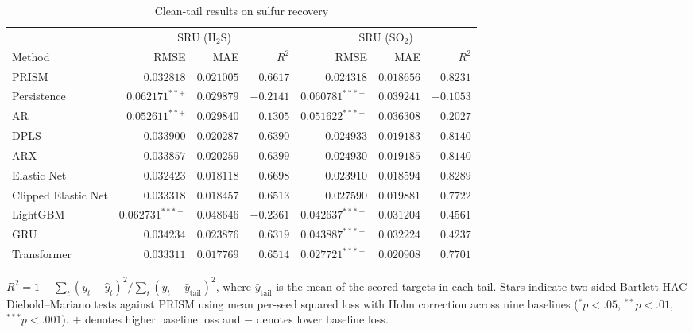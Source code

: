 \begin{table}[!t]
\centering
\caption{Clean-tail results on sulfur recovery}
\label{tab:clean-sru}
\small
\begin{tabular}{lrrrrrr}
\hline
 & \multicolumn{3}{c}{SRU ($\mathrm{H_2S}$)} & \multicolumn{3}{c}{SRU ($\mathrm{SO_2}$)} \\
\cline{2-4}\cline{5-7}
Method & RMSE & MAE & $R^2$ & RMSE & MAE & $R^2$ \\
\hline
PRISM & \(0.032818\) & \(0.021005\) & \(0.6617\) & \(0.024318\) & \(0.018656\) & \(0.8231\) \\
Persistence & \(0.062171^{\ast\ast+}\) & \(0.029879\) & \(-0.2141\) & \(0.060781^{\ast\ast\ast+}\) & \(0.039241\) & \(-0.1053\) \\
AR & \(0.052611^{\ast\ast+}\) & \(0.029840\) & \(0.1305\) & \(0.051622^{\ast\ast\ast+}\) & \(0.036308\) & \(0.2027\) \\
DPLS & \(0.033900\) & \(0.020287\) & \(0.6390\) & \(0.024933\) & \(0.019183\) & \(0.8140\) \\
ARX & \(0.033857\) & \(0.020259\) & \(0.6399\) & \(0.024930\) & \(0.019185\) & \(0.8140\) \\
Elastic Net & \(0.032423\) & \(0.018118\) & \(0.6698\) & \(0.023910\) & \(0.018594\) & \(0.8289\) \\
Clipped Elastic Net & \(0.033318\) & \(0.018457\) & \(0.6513\) & \(0.027590\) & \(0.019881\) & \(0.7722\) \\
LightGBM & \(0.062731^{\ast\ast\ast+}\) & \(0.048646\) & \(-0.2361\) & \(0.042637^{\ast\ast\ast+}\) & \(0.031204\) & \(0.4561\) \\
GRU & \(0.034234\) & \(0.023876\) & \(0.6319\) & \(0.043887^{\ast\ast\ast+}\) & \(0.032224\) & \(0.4237\) \\
Transformer & \(0.033311\) & \(0.017769\) & \(0.6514\) & \(0.027721^{\ast\ast\ast+}\) & \(0.020908\) & \(0.7701\) \\
\hline
\end{tabular}
\par\smallskip
\parbox{0.96\textwidth}{\footnotesize $R^2=1-\sum_t(y_t-\hat y_t)^2/\sum_t(y_t-\bar y_{\mathrm{tail}})^2$, where $\bar y_{\mathrm{tail}}$ is the mean of the scored targets in each tail. Stars indicate two-sided Bartlett HAC Diebold--Mariano tests against PRISM using mean per-seed squared loss with Holm correction across nine baselines (\({}^*p<.05\), \({}^{**}p<.01\), \({}^{***}p<.001\)). \(+\) denotes higher baseline loss and \(-\) denotes lower baseline loss.}
\end{table}

